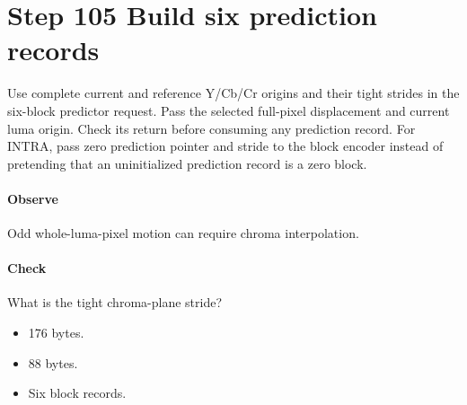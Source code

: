 \section{Step 105 Build six prediction records}\label{h263-picture-s05}
Use complete current and reference Y/Cb/Cr origins and their tight strides in
the six-block predictor request. Pass the selected full-pixel displacement and
current luma origin. Check its return before consuming any prediction record.
For INTRA, pass zero prediction pointer and stride to the block encoder instead
of pretending that an uninitialized prediction record is a zero block.

\paragraph{Observe} Odd whole-luma-pixel motion can require chroma interpolation.
\paragraph{Check} What is the tight chroma-plane stride?
\begin{itemize}
  \item[A.] 176 bytes.
  \item[B.] 88 bytes.
  \item[C.] Six block records.
\end{itemize}
